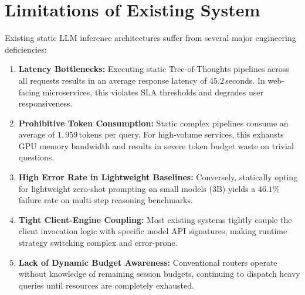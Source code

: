 \documentclass[12pt,a4paper]{report}
\begin{document}
\section{Limitations of Existing System}
\label{sec:limitations}
Existing static LLM inference architectures suffer from several major engineering deficiencies:
\begin{enumerate}[leftmargin=*]
    \item \textbf{Latency Bottlenecks:} Executing static Tree-of-Thoughts pipelines across all requests results in an average response latency of $45.2$\,seconds. In web-facing microservices, this violates SLA thresholds and degrades user responsiveness.
    \item \textbf{Prohibitive Token Consumption:} Static complex pipelines consume an average of $1,959$\,tokens per query. For high-volume services, this exhausts GPU memory bandwidth and results in severe token budget waste on trivial questions.
    \item \textbf{High Error Rate in Lightweight Baselines:} Conversely, statically opting for lightweight zero-shot prompting on small models ($3\text{B}$) yields a $46.1\%$ failure rate on multi-step reasoning benchmarks.
    \item \textbf{Tight Client-Engine Coupling:} Most existing systems tightly couple the client invocation logic with specific model API signatures, making runtime strategy switching complex and error-prone.
    \item \textbf{Lack of Dynamic Budget Awareness:} Conventional routers operate without knowledge of remaining session budgets, continuing to dispatch heavy queries until resources are completely exhausted.
\end{enumerate}
\end{document}
